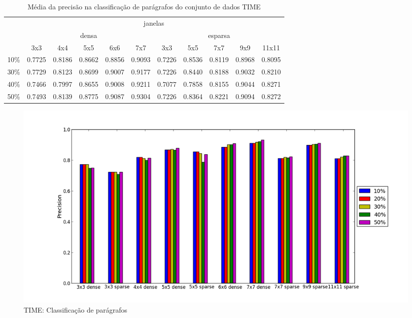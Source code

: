 \documentclass[a4paper,11pt]{article}
\begin{document}
  \begin{center}
    \begin{table}[p]
      \caption{Média da precisão na classificação de parágrafos do conjunto de dados TIME}
      \begin{tabular}{ l | c c c c c || c c c c c | }
        \cline{2-11}
        & \multicolumn{10}{|c|}{janelas} \\
        \cline{2-11}
        & \multicolumn{5}{c||}{densa} & \multicolumn{5}{c|}{esparsa} \\
        \cline{2-11}
        & 3x3 & 4x4 & 5x5 & 6x6 & 7x7 & 3x3 & 5x5 & 7x7 & 9x9 & 11x11 \\
        \hline
        \multicolumn{1}{|l|}{10\%}& 0.7725& 0.8186& 0.8662& 0.8856& 0.9093& 0.7226& 0.8536& 0.8119& 0.8968& 0.8095\\
        \multicolumn{1}{|l|}{30\%}& 0.7729& 0.8123& 0.8699& 0.9007& 0.9177& 0.7226& 0.8440& 0.8188& 0.9032& 0.8210\\
        \multicolumn{1}{|l|}{40\%}& 0.7466& 0.7997& 0.8655& 0.9008& 0.9211& 0.7077& 0.7858& 0.8155& 0.9044& 0.8271\\
        \multicolumn{1}{|l|}{50\%}& 0.7493& 0.8139& 0.8775& 0.9087& 0.9304& 0.7226& 0.8364& 0.8221& 0.9094& 0.8272\\
        \hline  
      \end{tabular}
    \end{table}
  \end{center}

  \begin{figure}[p]
    \centerline{\includegraphics[width=1.2\textwidth]{assets/experiment_charts/time_TextRegion_paragraph_precision.png}}
    \caption{TIME: Classificação de parágrafos}
    \label{fig:time_TextRegion_paragraph_precision}
  \end{figure}  
\end{document}
